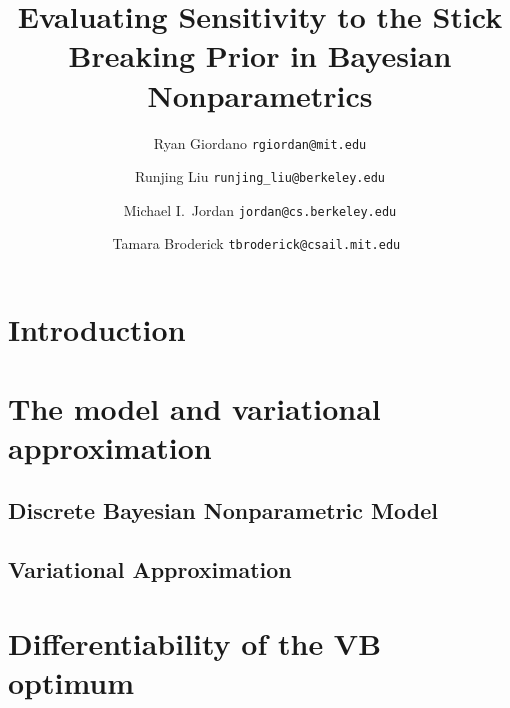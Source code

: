 \documentclass[11pt]{article}
\begin{document}



\title{Evaluating Sensitivity to the Stick Breaking Prior in Bayesian Nonparametrics}

\author{Ryan Giordano \texttt{rgiordan@mit.edu} \\
        \and
        Runjing Liu \texttt{runjing\_liu@berkeley.edu} \\
        \and
        Michael I.\ Jordan \texttt{jordan@cs.berkeley.edu} \\
        \and
        Tamara Broderick \texttt{tbroderick@csail.mit.edu }
        }

\maketitle

\begin{abstract}%

\end{abstract}


\section{Introduction}



\section{The model and variational approximation}
    \subsection{Discrete Bayesian Nonparametric Model}
    

    \subsection{Variational Approximation}
    



\section{Differentiability of the VB optimum}

\end{document}
